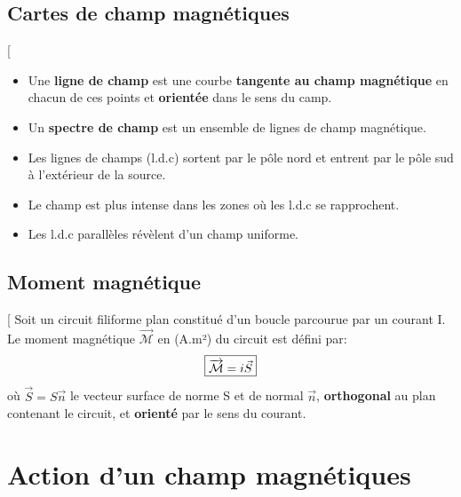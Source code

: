 \documentclass[12pt,hidelinks]{article}
\begin{document}
    \subsection{Cartes de champ magnétiques}
    \begin{DashedDefinition}{}[
        \begin{itemize}
            \item Une \textbf{ligne de champ} est une courbe \textbf{tangente au champ magnétique} en chacun de ces points et \textbf{orientée} dans le sens du camp.
            \item Un \textbf{spectre de champ} est un ensemble de lignes de champ magnétique.
        \end{itemize}
    \end{DashedDefinition}
        \begin{itemize}
            \item Les lignes de champs (l.d.c) sortent par le pôle nord et entrent par le pôle sud à l'extérieur de la source.
            \item Le champ est plus intense dans les zones où les l.d.c se rapprochent.
            \item Les l.d.c parallèles révèlent d'un champ uniforme.
        \end{itemize}
    \subsection{Moment magnétique}
        \begin{DashedDefinition}{}[
            Soit un circuit filiforme plan constitué d'un boucle parcourue par un courant I. Le moment magnétique $\overrightarrow{\mathcal{M}}$ en (A.m²) du circuit est défini par:
            \[\fbox{$\overrightarrow{\mathcal{M}}=i \vec S$}\]
            où $\vec S = S \vec n$ le vecteur surface de norme S et de normal $\vec n$, \textbf{orthogonal} au plan contenant le circuit, et \textbf{orienté} par le sens du courant.
        \end{DashedDefinition}

\newpage
\section{Action d'un champ magnétiques}
\vspace{3cm}
\end{document}

